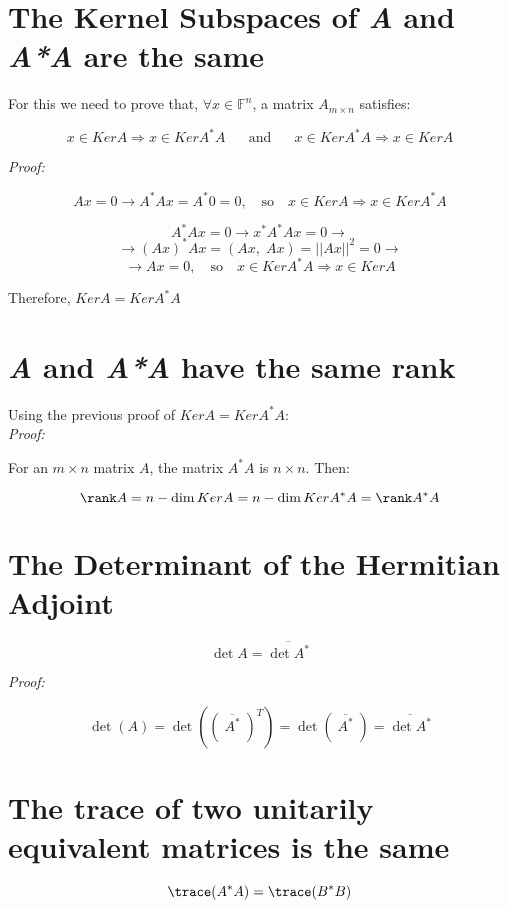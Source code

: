\section*{The Kernel Subspaces of \textit{A} and \textit{A*A} are the same}

For this we need to prove that, $\forall x\in \mathbb{F}^n$, a matrix $A_{m\times n}$ satisfies:

$$x\in KerA \Rightarrow x\in KerA^*A\text{ }\text{ }\text{ and }\text{ }\text{ }x\in KerA^*A \Rightarrow x\in KerA$$

\textit{Proof:}

$$Ax=0 \rightarrow A^*Ax=A^*0=0,\text{ }\text{ so }\text{ }x\in KerA \Rightarrow x\in KerA^*A$$

$$A^*Ax=0 \rightarrow x^*A^*Ax=0\rightarrow$$
$$\rightarrow(Ax)^*Ax=(Ax,\;Ax)=||Ax||^2=0\rightarrow$$ 
$$\rightarrow Ax=0,\text{ }\text{ so }\text{ }x\in KerA^*A \Rightarrow x\in KerA$$

Therefore, $KerA=KerA^*A$

\section*{\textit{A} and \textit{A*A} have the same rank}

Using the previous proof of $KerA=KerA^*A$:\\

\textit{Proof:}

For an $m\times n$ matrix $A$, the matrix $A^*A$ is $n\times n$. Then:

$$\rank A=n-\dim KerA=n-\dim KerA^*A=\rank A^*A$$

\section*{The Determinant of the Hermitian Adjoint}\label{sec:detadj} 

$$\det A=\overline{\det A^*}$$

\textit{Proof:}

$$\det (A)=\det \left(\left(\;\overline{A^*}\;\right)^T\right)=\det \left(\;\overline{A^*}\;\right)=\overline{\det A^*}$$

\section*{The trace of two unitarily equivalent matrices is the same}\label{sec:unittrace} 

$$\trace (A^*A)=\trace (B^*B)$$

